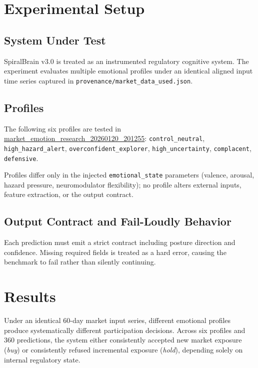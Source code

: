 \documentclass[12pt,a4paper]{report}
\begin{document}
\section{Experimental Setup}

\subsection{System Under Test}

SpiralBrain v3.0 is treated as an instrumented regulatory cognitive system. The experiment evaluates multiple emotional profiles under an identical aligned input time series captured in \texttt{provenance/market\_data\_used.json}.

\pagebreak

\subsection{Profiles}

The following six profiles are tested in \href{https://github.com/jhcragin/SpiralBrain-v3.0-public/tree/main/market_emotion_risk_posture/results}{market_emotion_research_20260120_201255}:
\texttt{control\_neutral}, \texttt{high\_hazard\_alert}, \texttt{overconfident\_explorer}, \texttt{high\_uncertainty}, \texttt{complacent}, \texttt{defensive}.

Profiles differ only in the injected \texttt{emotional\_state} parameters (valence, arousal, hazard pressure, neuromodulator flexibility); no profile alters external inputs, feature extraction, or the output contract.

\subsection{Output Contract and Fail-Loudly Behavior}

Each prediction must emit a strict contract including posture direction and confidence. Missing required fields is treated as a hard error, causing the benchmark to fail rather than silently continuing.

\section{Results}

Under an identical 60-day market input series, different emotional profiles produce systematically different participation decisions. Across six profiles and 360 predictions, the system either consistently accepted new market exposure (\emph{buy}) or consistently refused incremental exposure (\emph{hold}), depending solely on internal regulatory state.
\end{document}
